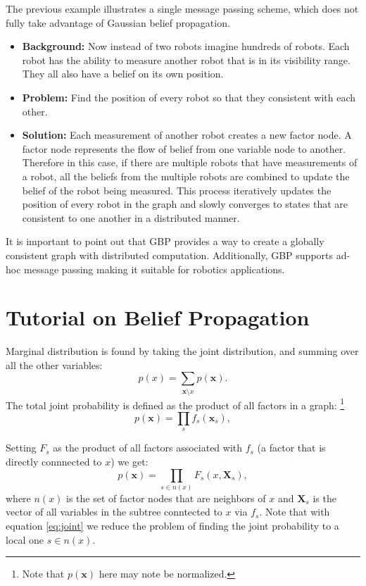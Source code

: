 \documentclass[twocolumn]{article}
\begin{document}
The previous example illustrates a single message passing scheme, which does not fully take advantage of Gaussian belief propagation.

\begin{itemize}
    \item \textbf{Background:} Now instead of two robots imagine hundreds of robots. Each robot has the ability to measure another robot that is in its visibility range. They all also have a belief on its own position.
    \item \textbf{Problem:} Find the position of every robot so that they consistent with each other.
    \item \textbf{Solution:} Each measurement of another robot creates a new factor node. A factor node represents the flow of belief from one variable node to another. Therefore in this case, if there are multiple robots that have measurements of a robot, all the beliefs from the multiple robots are combined to update the belief of the robot being measured. This process iteratively updates the position of every robot in the graph and slowly converges to states that are consistent to one another in a distributed manner.
\end{itemize}

It is important to point out that GBP provides a way to create a globally consistent graph with distributed computation. Additionally, GBP supports ad-hoc message passing making it suitable for robotics applications.

\section{Tutorial on Belief Propagation}

Marginal distribution is found by taking the joint distribution, and summing over all the other variables:
\begin{equation}
    p(x) = \sum_{\textbf{x} \setminus x}{p(\textbf{x})}.
    \label{eq:marginal}
\end{equation}
The total joint probability is defined as the product of all factors in a graph: \footnote{Note that $p(\textbf{x})$ here may note be normalized.}
\begin{equation}
    p(\textbf{x}) = \prod_s{f_s(\textbf{x}_s)},
\end{equation}

Setting $F_s$ as the product of all factors associated with $f_s$ (a factor that is directly connnected to $x$) we get:
\begin{equation}
    p(\textbf{x}) = \prod_{s \in n(x)}{F_s(x, \textbf{X}_s)},
    \label{eq:joint}
\end{equation}
where $n(x)$ is the set of factor nodes that are neighbors of $x$ and $\textbf{X}_s$ is the vector of all variables in the subtree conntected to $x$ via $f_s$. Note that with equation \ref{eq:joint} we reduce the problem of finding the joint probability to a local one $s\in n(x)$.
 
\end{document}
